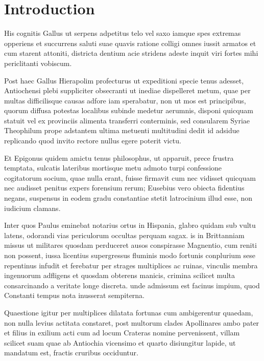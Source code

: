 \chapter*{Introduction}
His cognitis Gallus ut serpens adpetitus telo vel saxo iamque spes extremas opperiens et succurrens saluti suae quavis ratione colligi omnes iussit armatos et cum starent attoniti, districta dentium acie stridens adeste inquit viri fortes mihi periclitanti vobiscum.

Post haec Gallus Hierapolim profecturus ut expeditioni specie\cite{montemurro2020emotional} tenus adesset, Antiochensi plebi suppliciter obsecranti ut inediae dispelleret metum, quae per multas difficilisque causas adfore iam sperabatur, non ut mos est principibus, quorum diffusa potestas localibus subinde medetur aerumnis, disponi quicquam statuit vel ex provinciis alimenta transferri conterminis, sed consularem Syriae Theophilum prope adstantem ultima metuenti multitudini dedit id adsidue replicando quod invito rectore nullus egere poterit victu.

Et Epigonus quidem amictu tenus philosophus, ut apparuit, prece frustra temptata, sulcatis lateribus mortisque metu admoto turpi confessione cogitatorum socium, quae nulla erant, fuisse firmavit cum nec vidisset quicquam nec audisset penitus expers forensium rerum; Eusebius vero obiecta fidentius negans, suspensus in eodem gradu constantiae stetit latrocinium illud esse, non iudicium clamans.

Inter quos Paulus eminebat notarius ortus in Hispania, glabro quidam sub vultu latens, odorandi vias periculorum occultas perquam sagax. is in Brittanniam missus ut militares quosdam perduceret ausos conspirasse Magnentio, cum reniti non possent, iussa licentius supergressus fluminis modo fortunis conplurium sese repentinus infudit et ferebatur per strages multiplices ac ruinas, vinculis membra ingenuorum adfligens et quosdam obterens manicis, crimina scilicet multa consarcinando a veritate longe discreta. unde admissum est facinus impium, quod Constanti tempus nota inusserat sempiterna.

Quaestione igitur per multiplices dilatata fortunas cum ambigerentur quaedam, non nulla levius actitata constaret, post multorum clades Apollinares ambo pater et filius in exilium acti cum ad locum Crateras nomine pervenissent, villam scilicet suam quae ab Antiochia vicensimo et quarto disiungitur lapide, ut mandatum est, fractis cruribus occiduntur.

